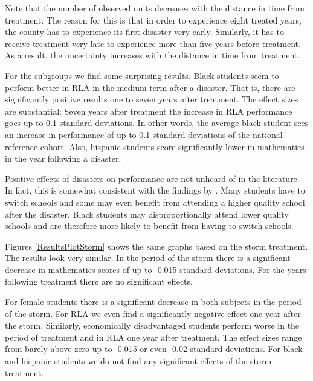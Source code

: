 Note that the number of observed units decreases with the distance in time from treatment. The reason for this is that in order to experience eight treated years, the county has to experience its first disaster very early. Similarly, it has to receive treatment very late to experience more than five years before treatment. As a result, the uncertainty increases with the distance in time from treatment.

For the subgroups we find some surprising results. Black students seem to perform better in RLA in the medium term after a disaster. That is, there are significantly positive results one to seven years after treatment. The effect sizes are substantial: Seven years after treatment the increase in RLA performance goes up to 0.1 standard deviations. In other words, the average black student sees an increase in performance of up to 0.1 standard deviations of the national reference cohort. Also, hispanic students score significantly lower in mathematics in the year following a disaster.



Positive effects of disasters on performance are not unheard of in the literature. In fact, this is somewhat consistent with the findings by \cite{Sacerdote_2012}. Many students have to switch schools and some may even benefit from attending a higher quality school after the disaster. Black students may disproportionally attend lower quality schools and are therefore more likely to benefit from having to switch schools. 

Figures \ref{ResultsPlotStorm} shows the same graphs based on the storm treatment. The results look very similar. In the period of the storm there is a significant decrease in mathematics scores of up to -0.015 standard deviations. For the years following treatment there are no significant effects.

For female students there is a significant decrease in both subjects in the period of the storm. For RLA we even find a significantly negative effect one year after the storm. Similarly, economically disadvantaged students perform worse in the period of treatment and in RLA one year after treatment. The effect sizes range from barely above zero up to -0.015 or even -0.02 standard deviations. For black and hispanic students we do not find any significant effects of the storm treatment.


